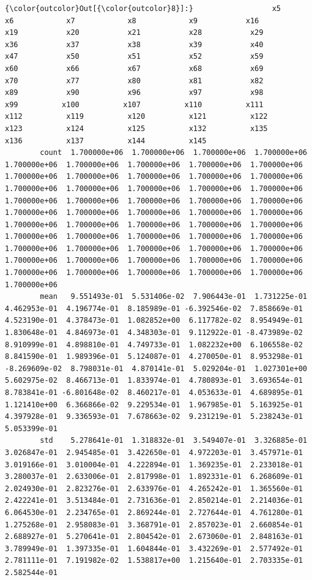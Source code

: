\documentclass[11pt]{article}
\begin{document}
\begin{Verbatim}[commandchars=\\\{\}]
{\color{outcolor}Out[{\color{outcolor}8}]:}                  x5            x6            x7            x8            x9           x16           x19           x20           x21           x28           x29           x36           x37           x38           x39           x40           x47           x50           x51           x52           x59           x60           x66           x67           x68           x69           x70           x77           x80           x81           x82           x89           x90           x96           x97           x98           x99          x100          x107          x110          x111          x112          x119          x120          x121          x122          x123          x124          x125          x132          x135          x136          x137          x144          x145
        count  1.700000e+06  1.700000e+06  1.700000e+06  1.700000e+06  1.700000e+06  1.700000e+06  1.700000e+06  1.700000e+06  1.700000e+06  1.700000e+06  1.700000e+06  1.700000e+06  1.700000e+06  1.700000e+06  1.700000e+06  1.700000e+06  1.700000e+06  1.700000e+06  1.700000e+06  1.700000e+06  1.700000e+06  1.700000e+06  1.700000e+06  1.700000e+06  1.700000e+06  1.700000e+06  1.700000e+06  1.700000e+06  1.700000e+06  1.700000e+06  1.700000e+06  1.700000e+06  1.700000e+06  1.700000e+06  1.700000e+06  1.700000e+06  1.700000e+06  1.700000e+06  1.700000e+06  1.700000e+06  1.700000e+06  1.700000e+06  1.700000e+06  1.700000e+06  1.700000e+06  1.700000e+06  1.700000e+06  1.700000e+06  1.700000e+06  1.700000e+06  1.700000e+06  1.700000e+06  1.700000e+06  1.700000e+06  1.700000e+06
        mean   9.551493e-01  5.531406e-02  7.906443e-01  1.731225e-01  4.462953e-01  4.196774e-01  8.185989e-01 -6.392546e-02  7.858669e-01  4.523190e-01  4.378473e-01  1.082852e+00  6.117782e-02  8.954949e-01  1.830648e-01  4.846973e-01  4.348303e-01  9.112922e-01 -8.473989e-02  8.910999e-01  4.898810e-01  4.749733e-01  1.082232e+00  6.106558e-02  8.841590e-01  1.989396e-01  5.124087e-01  4.270050e-01  8.953298e-01 -8.269609e-02  8.798031e-01  4.870141e-01  5.029204e-01  1.027301e+00  5.602975e-02  8.466713e-01  1.833974e-01  4.780893e-01  3.693654e-01  8.783841e-01 -6.801648e-02  8.460217e-01  4.053633e-01  4.689895e-01  1.121410e+00  6.366866e-02  9.229534e-01  1.967985e-01  5.163925e-01  4.397928e-01  9.336593e-01  7.678663e-02  9.231219e-01  5.238243e-01  5.053399e-01
        std    5.278641e-01  1.318832e-01  3.549407e-01  3.326885e-01  3.026847e-01  2.945485e-01  3.422650e-01  4.972203e-01  3.457971e-01  3.019166e-01  3.010004e-01  4.222894e-01  1.369235e-01  2.233018e-01  3.280037e-01  2.633006e-01  2.817998e-01  1.892331e-01  6.268609e-01  2.024930e-01  2.823276e-01  2.633976e-01  4.265242e-01  1.365560e-01  2.422241e-01  3.513484e-01  2.731636e-01  2.850214e-01  2.214036e-01  6.064530e-01  2.234765e-01  2.869244e-01  2.727644e-01  4.761280e-01  1.275268e-01  2.958083e-01  3.368791e-01  2.857023e-01  2.660854e-01  2.688927e-01  5.270641e-01  2.804542e-01  2.673060e-01  2.848163e-01  3.789949e-01  1.397335e-01  1.604844e-01  3.432269e-01  2.577492e-01  2.781111e-01  7.191982e-02  1.538817e+00  1.215640e-01  2.703335e-01  2.582544e-01

\end{Verbatim}
\end{document}
